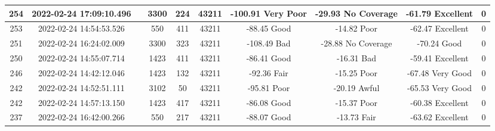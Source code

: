 \begin{longtable*}{|c|c|c|c|c|c|c|c|c|c|}
254&2022-02-24 17:09:10.496&&3300&224&43211& -100.91   Very Poor   & -29.93    No Coverage & -61.79    Excellent   & 0\\\hline
{}253&2022-02-24 14:54:53.526&&550&411&43211& -88.45    Good        & -14.82    Poor        & -62.47    Excellent   & 0\\\hline
{}251&2022-02-24 16:24:02.009&&3300&323&43211& -108.49   Bad         & -28.88    No Coverage & -70.24    Good        & 0\\\hline
{}250&2022-02-24 14:55:07.714&&1423&411&43211& -86.41    Good        & -16.31    Bad         & -59.41    Excellent   & 0\\\hline
{}246&2022-02-24 14:42:12.046&&1423&132&43211& -92.36    Fair        & -15.25    Poor        & -67.48    Very Good   & 0\\\hline
{}242&2022-02-24 14:52:51.111&&3102&50&43211& -95.81    Poor        & -20.19    Awful       & -65.53    Very Good   & 0\\\hline
{}242&2022-02-24 14:57:13.150&&1423&417&43211& -86.08    Good        & -15.37    Poor        & -60.38    Excellent   & 0\\\hline
{}237&2022-02-24 16:42:00.266&&550&217&43211& -88.07    Good        & -13.73    Fair        & -63.62    Excellent   & 0\\\hline

\end{longtable*}
